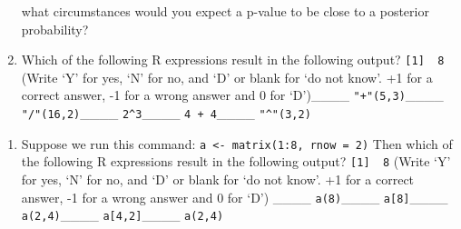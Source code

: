 \documentclass[
]{article}
\providecommand{\tightlist}{%
  \setlength{\itemsep}{0pt}\setlength{\parskip}{0pt}}
\begin{document}
\begin{enumerate}
  what circumstances would you expect a p-value to be close to a
  posterior probability? \vspace{0px}
\item
  Which of the following R expressions result in the following output?
  \newline\newline \texttt{{[}1{]}\ \ 8} \newline\newline (Write `Y' for
  yes, `N' for no, and `D' or blank for `do not know'. +1 for a correct
  answer, -1 for a wrong answer and 0 for `D')\newline\newline \_\_\_\_
  \texttt{"+"(5,3)}\newline\newline \_\_\_\_
  \texttt{"/"(16,2)}\newline\newline \_\_\_\_
  \texttt{2\^{}3}\newline\newline \_\_\_\_
  \texttt{4\ +\ 4}\newline\newline \_\_\_\_ \texttt{"\^{}"(3,2)}
\end{enumerate}

\vspace{0px}

\begin{enumerate}
\def\labelenumi{\arabic{enumi}.}
\setcounter{enumi}{100}
\tightlist
\item
  Suppose we run this command: \newline\newline
  \texttt{a\ \textless{}-\ matrix(1:8,\ rnow\ =\ 2)} \newline\newline
  Then which of the following R expressions result in the following
  output? \newline\newline \texttt{{[}1{]}\ \ 8} \newline\newline (Write
  `Y' for yes, `N' for no, and `D' or blank for `do not know'. +1 for a
  correct answer, -1 for a wrong answer and 0 for `D')\newline\newline
  \_\_\_\_ \texttt{a(8)}\newline\newline \_\_\_\_
  \texttt{a{[}8{]}}\newline\newline \_\_\_\_
  \texttt{a(2,4)}\newline\newline \_\_\_\_
  \texttt{a{[}4,2{]}}\newline\newline \_\_\_\_ \texttt{a(2,4)}
\end{enumerate}
\end{document}
